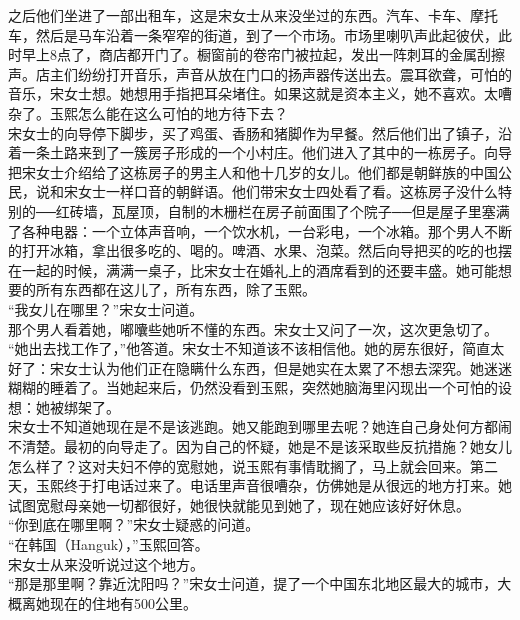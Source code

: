 之后他们坐进了一部出租车，这是宋女士从来没坐过的东西。汽车、卡车、摩托车，然后是马车沿着一条窄窄的街道，到了一个市场。市场里喇叭声此起彼伏，此时早上8点了，商店都开门了。橱窗前的卷帘门被拉起，发出一阵刺耳的金属刮擦声。店主们纷纷打开音乐，声音从放在门口的扬声器传送出去。震耳欲聋，可怕的音乐，宋女士想。她想用手指把耳朵堵住。如果这就是资本主义，她不喜欢。太嘈杂了。玉熙怎么能在这么可怕的地方待下去？\\

宋女士的向导停下脚步，买了鸡蛋、香肠和猪脚作为早餐。然后他们出了镇子，沿着一条土路来到了一簇房子形成的一个小村庄。他们进入了其中的一栋房子。向导把宋女士介绍给了这栋房子的男主人和他十几岁的女儿。他们都是朝鲜族的中国公民，说和宋女士一样口音的朝鲜语。他们带宋女士四处看了看。这栋房子没什么特别的──红砖墙，瓦屋顶，自制的木栅栏在房子前面围了个院子──但是屋子里塞满了各种电器：一个立体声音响，一个饮水机，一台彩电，一个冰箱。那个男人不断的打开冰箱，拿出很多吃的、喝的。啤酒、水果、泡菜。然后向导把买的吃的也摆在一起的时候，满满一桌子，比宋女士在婚礼上的酒席看到的还要丰盛。她可能想要的所有东西都在这儿了，所有东西，除了玉熙。\\

“我女儿在哪里？”宋女士问道。\\

那个男人看着她，嘟囔些她听不懂的东西。宋女士又问了一次，这次更急切了。\\

“她出去找工作了，”他答道。宋女士不知道该不该相信他。她的房东很好，简直太好了：宋女士认为他们正在隐瞒什么东西，但是她实在太累了不想去深究。她迷迷糊糊的睡着了。当她起来后，仍然没看到玉熙，突然她脑海里闪现出一个可怕的设想：她被绑架了。\\

宋女士不知道她现在是不是该逃跑。她又能跑到哪里去呢？她连自己身处何方都闹不清楚。最初的向导走了。因为自己的怀疑，她是不是该采取些反抗措施？她女儿怎么样了？这对夫妇不停的宽慰她，说玉熙有事情耽搁了，马上就会回来。第二天，玉熙终于打电话过来了。电话里声音很嘈杂，仿佛她是从很远的地方打来。她试图宽慰母亲她一切都很好，她很快就能见到她了，现在她应该好好休息。\\

“你到底在哪里啊？”宋女士疑惑的问道。\\

“在韩国（Hanguk），”玉熙回答。\\

宋女士从来没听说过这个地方。\\

“那是那里啊？靠近沈阳吗？”宋女士问道，提了一个中国东北地区最大的城市，大概离她现在的住地有500公里。\\

